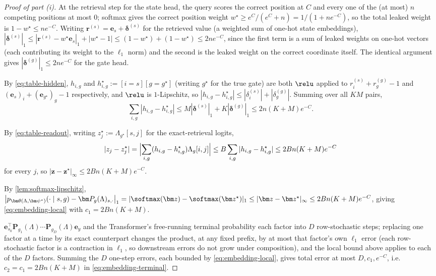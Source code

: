 \begin{proof}[Proof of part (i)]
 At the retrieval step for the state head,
the query scores the correct position at $C$ and every one of the (at
most) $n$ competing positions at most $0$; softmax gives the correct
position weight $w^\star\ge e^C/(e^C+n)=1/(1+ne^{-C})$, so the total
leaked weight is $1-w^\star\le ne^{-C}$. Writing
$\bm{r}^{(s)}=\bm{e}_s+\bm\delta^{(s)}$ for the retrieved value (a weighted
sum of one-hot state embeddings), $|\bm\delta^{(s)}|_1
\le|\bm r^{(s)}-w^\star\bm e_s|_1+|w^\star-1|
\le(1-w^\star)+(1-w^\star)\le2ne^{-C}$, since the first term is a
sum of leaked weights on one-hot vectors (each contributing its weight to
the $\ell_1$ norm) and the second is the leaked weight on the correct
coordinate itself. The identical argument gives
$|\bm\delta^{(g)}|_1\le2ne^{-C}$ for the gate head.

 By \cref{eq:table-hidden}, $h_{i,g}$ and
$h^\star_{i,g}:=[i=s][g=g^\star]$ (writing $g^\star$ for the true gate)
are both $\relu$ applied to $r^{(s)}_i+r^{(g)}_g-1$ and
$(\bm e_s)_i+(\bm e_{g^\star})_g-1$ respectively, and $\relu$ is
$1$-Lipschitz, so $|h_{i,g}-h^\star_{i,g}|\le|\delta^{(s)}_i|+|\delta^{(g)}_g|$.
Summing over all $KM$ pairs,
\[
 \sum_{i,g}|h_{i,g}-h^\star_{i,g}|
 \le M|\bm\delta^{(s)}|_1+K|\bm\delta^{(g)}|_1
 \le2n(K+M)e^{-C}.
\]

 By \cref{eq:table-readout}, writing
$z^\star_j:=\Lambda_{g^\star}[s,j]$ for the exact-retrieval logits,
\[
 |z_j-z^\star_j|=\Bigl|\sum_{i,g}(h_{i,g}-h^\star_{i,g})\Lambda_g[i,j]\Bigr|
 \le B\sum_{i,g}|h_{i,g}-h^\star_{i,g}|\le2Bn(K+M)e^{-C}
\]
for every $j$, so $|\bm z-\bm z^\star|_\infty\le2Bn(K+M)e^{-C}$.

 By \cref{lem:softmax-lipschitz},
$\bigl|p_{\bm\theta(\Lambda,\bm\psi^\star)}(\cdot\mid s,g)-\bm P_g(\Lambda)_{s,\cdot}\bigr|_1
=|\softmax(\bm z)-\softmax(\bm z^\star)|_1\le|\bm z-\bm z^\star|_\infty
\le2Bn(K+M)e^{-C}$, giving \cref{eq:embedding-local} with $c_1=2Bn(K+M)$.

 $\bm e_{s_0}^\top\bm P_{g_1}(\Lambda)\cdots\bm
P_{g_D}(\Lambda)\bm e_y$ and the Transformer's free-running terminal probability
each factor into $D$ row-stochastic steps; replacing one factor at a time
by its exact counterpart changes the product, at any fixed prefix, by at
most that factor's own $\ell_1$ error (each row-stochastic factor is a
contraction in $\ell_1$, so downstream errors do not grow under
composition), and the local bound above applies to each of the $D$
factors. Summing the $D$ one-step errors, each bounded by
\cref{eq:embedding-local}, gives total error at most $D,c_1,e^{-C}$, i.e.
$c_2=c_1=2Bn(K+M)$ in \cref{eq:embedding-terminal}.
\end{proof}

